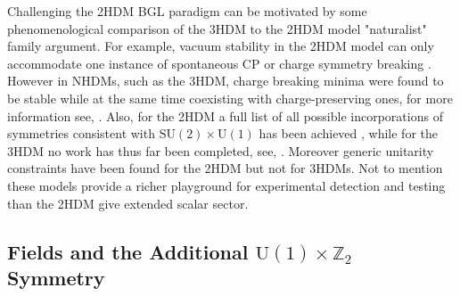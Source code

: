 Challenging the 2HDM BGL paradigm can be motivated by some phenomenological comparison of the 3HDM to the 2HDM model  "naturalist" family argument.
%
For example, vacuum stability in the 2HDM model can only accommodate one instance of spontaneous CP or charge symmetry breaking \cite{Branco_2012,Ferreira_2004,Barroso_2007}. 
%
However\Joaoadd{,} in  NHDMs, such as the 3HDM, charge breaking minima were found to be stable while at the same time coexisting with charge-preserving ones, for more information see, \cite{Barroso_2006}.   
%
Also, for the 2HDM\Joaoadd{,} a full list of all possible incorporations of symmetries consistent with $\mathrm{SU(2)}\times\mathrm{U(1)}$ has been achieved \cite{Ivanov_2008,Ivanov2007}, while for the 3HDM no work has thus far been completed, see, \cite{Ivanov_2012,Ivanov_2015}. 
%
Moreover generic unitarity constraints have been found for the 2HDM \cite{Ginzburg_2005} but not for 3HDMs. 
%
Not to mention\Joaoadd{,} these models provide a richer playground for experimental detection and testing than the 2HDM give  extended scalar sector. 

\subsection{Fields and the Additional $\mathrm{U(1)}\times\mathbb{Z}_2$ Symmetry}

